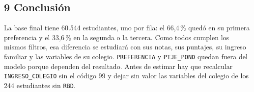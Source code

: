 \documentclass[11pt]{article}
\begin{document}
\subsection*{9 \; Conclusión}

La base final tiene 60.544 estudiantes, uno por fila: el 66,4\,\% quedó
en su primera preferencia y el 33,6\,\% en la segunda o la tercera. Como
todos cumplen los mismos filtros, esa diferencia se estudiará con sus
notas, sus puntajes, su ingreso familiar y las variables de su colegio.
\texttt{PREFERENCIA} y \texttt{PTJE\_POND} quedan fuera del modelo porque
dependen del resultado. Antes de estimar hay que recalcular
\texttt{INGRESO\_COLEGIO} sin el código 99 y dejar sin valor las
variables del colegio de los 244 estudiantes sin \texttt{RBD}.

\end{document}
